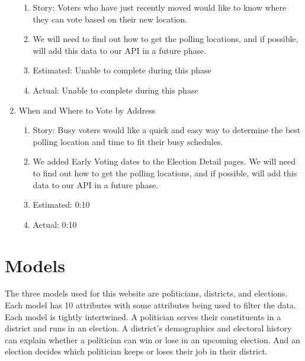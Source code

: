 \documentclass[11t]{article}
\begin{document}
\begin{enumerate}
    \begin{enumerate}
        \item Story: Voters who have just recently moved would like to know where they can vote based on their new location.
        \item We will need to find out how to get the polling locations, and if possible, will add this data to our API in a future phase.
        \item Estimated: Unable to complete during this phase
        \item Actual: Unable to complete during this phase
    \end{enumerate}
    \item When and Where to Vote by Address
    \begin{enumerate}
        \item Story: Busy voters would like a quick and easy way to determine the best polling location and time to fit their busy schedules.
        \item We added Early Voting dates to the Election Detail pages. We will need to find out how to get the polling locations, and if possible, will add this data to our API in a future phase.
        \item Estimated: 0:10
        \item Actual: 0:10
    \end{enumerate}
\end{enumerate}

\section{Models}
The three models used for this website are politicians, districts, and elections. Each model has 10 attributes with some attributes being used to filter the data. Each model is tightly intertwined. A politician serves their constituents in a district and runs in an election. A district’s demographics and electoral history can explain whether a politician can win or lose in an upcoming election. And an election decides which politician keeps or loses their job in their district.
\end{document}
